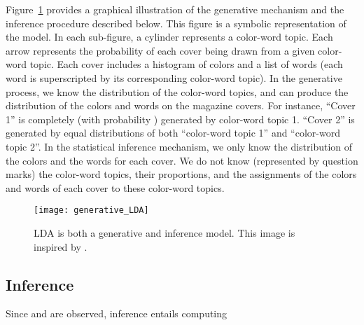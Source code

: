 \documentclass[prodmode,acmtochi]{acmsmall}
\begin{document}
Figure~\ref{LDAGenerative} provides a graphical illustration of the
generative mechanism and the inference procedure described below.
This figure is a symbolic representation of the model. In each sub-figure, a cylinder represents a color-word topic. Each arrow represents the probability of each cover being drawn from a given color-word topic. Each cover includes a histogram of colors and a list of words (each word is superscripted by its corresponding color-word topic). In the generative process, we know the distribution of the color-word topics, and can produce the distribution of the colors and words on the magazine covers. For instance, ``Cover 1'' is completely (with probability ) generated by color-word topic 1. ``Cover 2'' is generated by equal distributions of both ``color-word topic 1'' and ``color-word topic 2''. In the statistical inference mechanism, we only know the distribution of the colors and the words for each cover. We do not know (represented by question marks) the color-word topics, their proportions, and the assignments of the colors and words of each cover to these color-word topics.

\begin{figure}[h!tb]
  \centering
  \texttt{[image: generative\_LDA]}
  \caption{LDA is both a generative and inference model. This image is inspired by \protect\cite{steyvers2007probabilistic}.}
  \label{LDAGenerative}
\end{figure}

\subsection{Inference}
\label{sec:Inference}

Since  and  are observed, inference
entails computing
\end{document}
